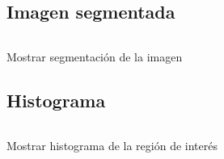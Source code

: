 \subsection{Imagen segmentada}
\begin{listing}[!ht]
\inputminted{python}{code_listings/show_segmentation.py}
\caption{Mostrar segmentación de la imagen}
\label{code:show_segmentation}
\end{listing}

\subsection{Histograma}
\begin{listing}[!ht]
\inputminted{python}{code_listings/show_histogram.py}
\caption{Mostrar histograma de la región de interés}
\label{code:show_histogram}
\end{listing}